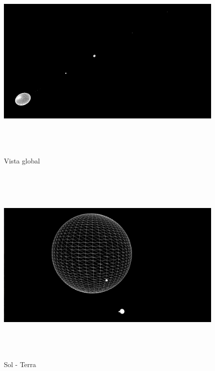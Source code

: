 \documentclass[11pt,a4paper]{report}
\begin{document}
\vspace{1cm}
\begin{figure}[H]
\centering
\includegraphics[width = 18cm,height = 10cm]{1.png}
\caption{Vista global}
\label{fig:demo1}
\end{figure}

\begin{figure}[H]
\centering
\includegraphics[width = 18cm,height = 10cm]{2.png}
\caption{Sol - Terra}
\label{fig:demo2}
\end{figure}
\end{document}

